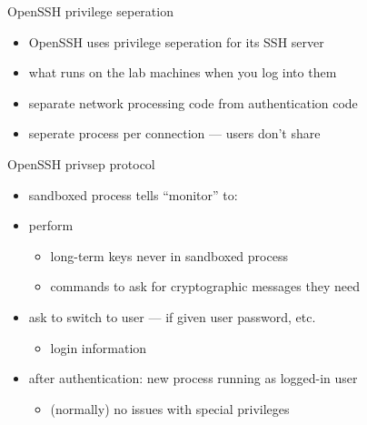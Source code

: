 \begin{frame}{OpenSSH privilege seperation}
    \begin{itemize}
    \item OpenSSH uses privilege seperation for its SSH server
    \item what runs on the lab machines when you log into them
    \vspace{.5cm}
    \item separate network processing code from authentication code
    \item seperate process per connection --- users don't share
    \end{itemize}
\end{frame}

\begin{frame}{OpenSSH privsep protocol}
    \begin{itemize}
    \item sandboxed process tells ``monitor'' to:
        \vspace{.25cm}
    \item perform 
        \begin{itemize}
        \item long-term keys never in sandboxed process
        \item commands to ask for cryptographic messages they need
        \end{itemize}
    \item ask to switch to user --- if given user password, etc.
        \begin{itemize}
            \item {} login information
        \end{itemize}
    \item after authentication: new process running as logged-in user 
        \begin{itemize}
            \item (normally) no issues with special privileges
        \end{itemize}
    \end{itemize}
\end{frame}


